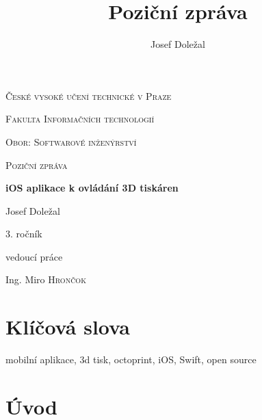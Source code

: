 \documentclass[czech]{article}
\begin{document}
\title{Poziční zpráva}
\author{Josef Doležal}

\begin{titlepage}
	\centering
	{\scshape\LARGE České vysoké učení technické v Praze \par}
	{\scshape\Large Fakulta Informačních technologií \par}
	{\scshape\Large Obor: Softwarové inženýrství \par}
	\vspace{1cm}
	{\scshape\Large Poziční zpráva\par}
	\vspace{1.5cm}
	{\huge\bfseries iOS aplikace k ovládání 3D tiskáren\par}
	\vspace{2cm}
	{\Large Josef Doležal\par}
	{\normalsize 3. ročník\par}
	\vfill
	vedoucí práce\par
	Ing. Miro \textsc{Hrončok}

	\vfill
\end{titlepage}

\newpage

\tableofcontents{}

\newpage

\section{Klíčová slova}

mobilní aplikace, 3d tisk, octoprint, iOS, Swift, open source


\section{Úvod}
\end{document}
